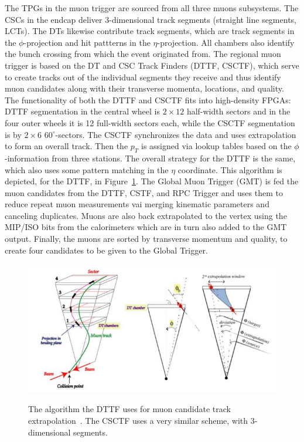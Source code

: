 The TPGs in the muon trigger are sourced from all three muons subsystems.  The CSCs in the endcap deliver 3-dimensional track segments (straight line segments, LCTs).  The DTs likewise contribute track segments, which are track segments in the $\phi$-projection and hit pattterns in the $\eta$-projection.  All chambers also identify the bunch crossing from which the event originated from.  The regional muon trigger is based on the DT and CSC Track Finders (DTTF, CSCTF), which serve to create tracks out of the individual segments they receive and thus identify muon candidates along with their transverse momenta, locations, and quality.  The functionality of both the DTTF and CSCTF fits into high-density FPGAs: DTTF segmentation in the central wheel is $2 \times 12$ half-width sectors and in the four outer wheels it is 12 full-width sectors each, while the CSCTF segmentation is by $2 \times 6$ $60^\circ$-sectors.  The CSCTF synchronizes the data and uses extrapolation to form an overall track.  Then the $p_T$ is assigned via lookup tables based on the $\phi$-information from three stations.  The overall strategy for the DTTF is the same, which also uses some pattern matching in the $\eta$ coordinate.  This algorithm is depicted, for the DTTF, in Figure~\ref{figapp:TrackFinder}.  The Global Muon Trigger (GMT) is fed the muon candidates from the DTTF, CSTF, and RPC Trigger and uses them to reduce repeat muon measurements vai merging kinematic parameters and canceling duplicates.  Muons are also back extrapolated to the vertex using the MIP/ISO bits from the calorimeters which are in turn also added to the GMT output.  Finally, the muons are sorted by transverse momentum and quality, to create four candidates to be given to the Global Trigger.

\begin{figure}[!Hh]
       \centering
       \includegraphics[scale=0.6]{Figures/TrackFinder.png} \\
       \caption[Track Finder track creation scheme.]{The algorithm the DTTF uses for muon candidate track extrapolation~\cite{CMSdetector}.  The CSCTF uses a very similar scheme, with 3-dimensional segments.}
\label{figapp:TrackFinder}
\end{figure}

